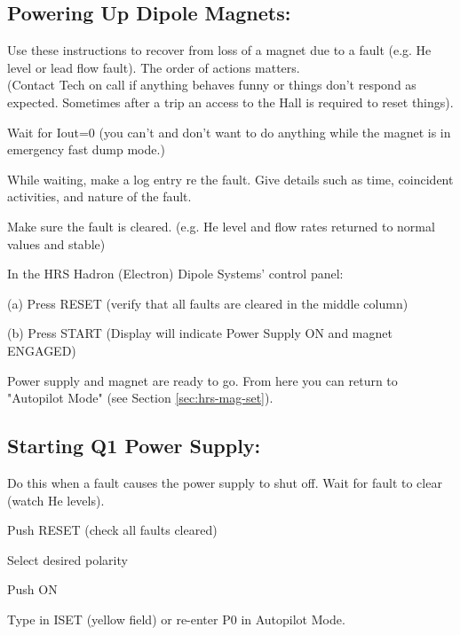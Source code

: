 {\subsection{Powering Up Dipole Magnets:}

Use these instructions to recover from loss of a magnet due to a fault
(e.g. He level or lead flow fault). The order of actions matters. \\
(Contact Tech on call if anything behaves funny or things don't
respond as expected. Sometimes after a trip an access to the Hall is
required to reset things).

\begin{list}{.~}{\setlength{\itemsep}{-0.15cm}}
   \item Wait for Iout=0 (you can't and don't want to do anything while the magnet is in emergency fast dump mode.)
   \item While waiting, make a log entry re the fault. Give details such as time, coincident activities, and nature of the fault.
   \item Make sure the fault is cleared. (e.g. He level and flow rates returned to normal values and stable)
   \item In the HRS Hadron (Electron) Dipole Systems' control panel:
   \begin{list}{}{\setlength{\itemsep}{-0.15cm}}
      \item[(a)] Press RESET (verify that all faults are cleared in the middle column)
      \item[(b)] Press START (Display will indicate Power Supply ON and magnet ENGAGED)
   \end{list}
\end{list}


Power supply and magnet are ready to go. From here you can return 
to "Autopilot Mode" (see Section \ref{sec:hrs-mag-set}).

\subsection{Starting Q1 Power Supply:}

 Do this when a fault causes the power supply to shut off.
 Wait for fault to clear (watch He levels). 
\begin{list}{.~}{\setlength{\itemsep}{-0.15cm}}
   \item Push RESET (check all faults cleared)
   \item Select desired polarity
   \item Push ON
   \item Type in ISET (yellow field) or re-enter P0 in Autopilot Mode.
\end{list}

}

